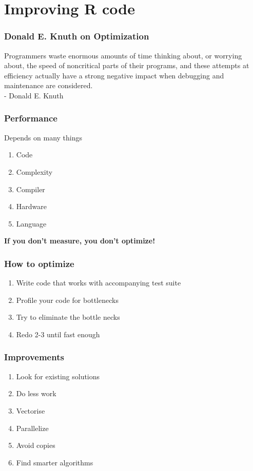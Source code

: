 \documentclass{beamer}
\begin{document}
\section{Improving R code}

\begin{frame}
	\frametitle{Donald E. Knuth on Optimization}
	Programmers waste enormous amounts of time thinking about, or worrying 
	about, the speed of noncritical parts of their programs, and these attempts 
	at efficiency actually have a strong negative impact when debugging and 
	maintenance are considered.\\
	- Donald E. Knuth
\end{frame}

\begin{frame}
	\frametitle{Performance}
	\begin{center}
		Depends on many things
		\begin{enumerate}
			\item Code
			\item Complexity
			\item Compiler
			\item Hardware
			\item Language
		\end{enumerate}
		\bigskip
		\textbf{If you don't measure, you don't optimize!}
	\end{center}
\end{frame}

\begin{frame}
	\frametitle{How to optimize}
	\begin{center}
		\begin{enumerate}
			\item Write code that works with accompanying test suite
			\item Profile your code for bottlenecks
			\item Try to eliminate the bottle necks
			\item Redo 2-3 until fast enough
		\end{enumerate}
	\end{center}
\end{frame}

\begin{frame}
	\frametitle{Improvements}
	\begin{center}
		\begin{enumerate}
			\item Look for existing solutions
			\item Do less work
			\item Vectorise
			\item Parallelize
			\item Avoid copies
			\item Find smarter algorithms 
		\end{enumerate}
	\end{center}
\end{frame}
\end{document}
